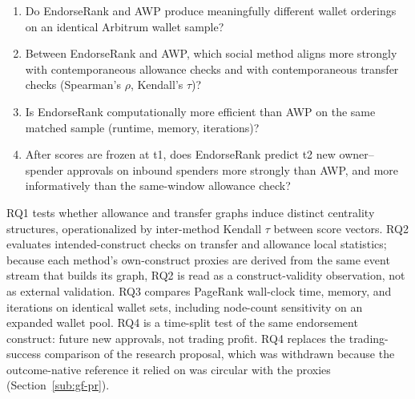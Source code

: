 \begin{enumerate}
\item[RQ1.] Do EndorseRank and AWP produce meaningfully different wallet orderings on an identical Arbitrum wallet sample?
\item[RQ2.] Between EndorseRank and AWP, which social method aligns more strongly with contemporaneous allowance checks and with contemporaneous transfer checks (Spearman's $\rho$, Kendall's $\tau$)?
\item[RQ3.] Is EndorseRank computationally more efficient than AWP on the same matched sample (runtime, memory, iterations)?
\item[RQ4.] After scores are frozen at t1, does EndorseRank predict t2 new owner--spender approvals on inbound spenders more strongly than AWP, and more informatively than the same-window allowance check?
\end{enumerate}

RQ1 tests whether allowance and transfer graphs induce distinct centrality structures, operationalized by inter-method Kendall $\tau$ between score vectors. RQ2 evaluates intended-construct checks on transfer and allowance local statistics; because each method's own-construct proxies are derived from the same event stream that builds its graph, RQ2 is read as a construct-validity observation, not as external validation. RQ3 compares PageRank wall-clock time, memory, and iterations on identical wallet sets, including node-count sensitivity on an expanded wallet pool. RQ4 is a time-split test of the same endorsement construct: future new approvals, not trading profit. RQ4 replaces the trading-success comparison of the research proposal, which was withdrawn because the outcome-native reference it relied on was circular with the proxies (Section~\ref{sub:gf-pr}).



